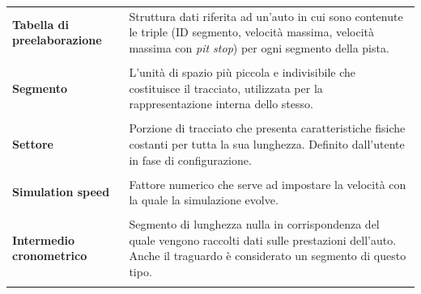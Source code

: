\documentclass[a4paper]{report}
\newcommand{\term}[2]{\textbf{#1} & #2 \\ \\}
\begin{document}
\begin{tabularx}{\textwidth}{lX}
\term{Tabella di preelaborazione}{Struttura dati riferita ad un'auto in cui sono contenute le triple (ID segmento, velocità massima, velocità massima con \textit{pit stop}) per ogni segmento della pista.}
\term{Segmento}{L'unità di spazio più piccola e indivisibile che costituisce il tracciato, utilizzata per la rappresentazione interna dello stesso.}
\term{Settore}{Porzione di tracciato che presenta caratteristiche fisiche costanti per tutta la sua lunghezza. Definito dall'utente in fase di configurazione.}
\term{Simulation speed}{Fattore numerico che serve ad impostare la velocità con la quale la simulazione evolve.}
\term{Intermedio cronometrico}{Segmento di lunghezza nulla in corrispondenza del quale vengono raccolti dati sulle prestazioni dell'auto. Anche il traguardo è considerato un segmento di questo tipo.}
\end{tabularx}
\end{document}
